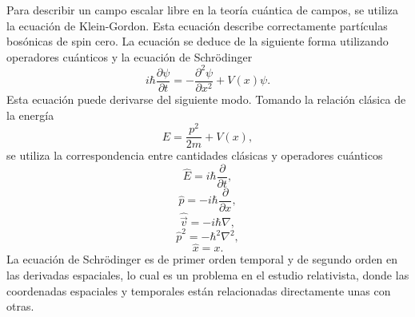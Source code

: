 \documentclass[a4paper,openright,12pt]{book}
\begin{document}
Para describir un campo escalar libre en la teoría cuántica de campos, se utiliza la ecuación de Klein-Gordon. Esta ecuación describe correctamente partículas bosónicas de spin cero. La ecuación se deduce de la siguiente forma utilizando operadores cuánticos y la ecuación de Schrödinger
\begin{equation}
i\hbar\frac{\partial \psi}{\partial t} = - \frac{\partial^{2}\psi}{\partial x^{2}}
+ V(x)\psi.\label{eqn 1.46}
\end{equation}
Esta ecuación puede derivarse del siguiente modo. Tomando la relación clásica de la energía
\begin{equation}
E = \frac{p^{2}}{2m} + V(x),\label{eqn 1.47}
\end{equation}
se utiliza la correspondencia entre cantidades clásicas y operadores cuánticos
\begin{equation*}
\hat{E}=i\hbar\frac{\partial}{\partial t},
\end{equation*}
\begin{equation*}
\hat{p} = -i\hbar\frac{\partial}{\partial x},
\end{equation*}
\begin{equation*}
\hat{\vec{v}}= -i\hbar\nabla,
\end{equation*}
\begin{equation*}
\hat{p}^{2}=-\hbar^{2}\nabla^{2},
\end{equation*}
\begin{equation*}
\hat{x}=x.
\end{equation*}
La ecuación de Schrödinger es de primer orden temporal y de segundo orden en las derivadas espaciales, lo cual es un problema en el estudio relativista, donde las coordenadas espaciales y temporales están relacionadas directamente unas con otras.
\end{document}
